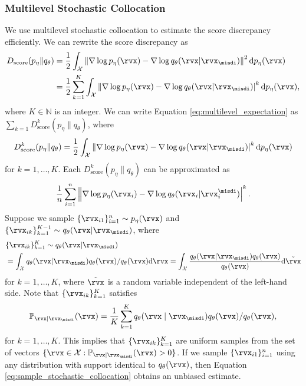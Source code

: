 \subsubsection{Multilevel Stochastic Collocation}
We use multilevel stochastic collocation \citep{Giles2008} to estimate the score discrepancy efficiently. We can rewrite the score discrepancy as
\begin{align}
	D_{\text{score}}(p_{\eta} \| q_{\theta}) &= \frac{1}{2} \int_{\mathcal{X}} \left\| \nabla \log p_{\eta}(\rvx) - \nabla \log q_{\theta}(\rvx | \rvx_{\misdi}) \right\|^{2} \mathrm{d} p_{\eta}(\rvx) \notag \\
	&= \frac{1}{2} \sum_{k=1}^{K} \int_{\mathcal{X}} \left\| \nabla \log p_{\eta}(\rvx) - \nabla \log q_{\theta}(\rvx | \rvx_{\misdi}) \right|^{k} \mathrm{d} p_{\eta}(\rvx), \label{eq:multilevel_expectation}
\end{align}
where $K \in \mathbb{N}$ is an integer.
We can write Equation \eqref{eq:multilevel_expectation} as $\sum_{k=1} D_{\text{score}}^{k}(p_{\eta} \| q_{\theta})$, where
\begin{align}
    D_{\text{score}}^{k}(p_{\eta} \| q_{\theta}) = \frac{1}{2} \int_{\mathcal{X}}  \left\| \nabla \log p_{\eta}(\rvx) - \nabla \log q_{\theta}(\rvx | \rvx_{\misdi}) \right|^{k} \mathrm{d} p_{\eta}(\rvx) \label{eq:multilevel_expectation_k}
\end{align}
for $k=1,\ldots,K$. Each $D_{\text{score}}^{k}(p_{\eta} \| q_{\theta})$ can be approximated as
\begin{align}
	\frac{1}{n} \sum_{i=1}^{n} \left\| \nabla \log p_{\eta}(\rvx_{i}) - \nabla \log q_{\theta}(\rvx_{i} | \rvx_{i}^{\misdi}) \right|^{k}. \label{eq:multilevel_expectation_k_2}
\end{align}
Suppose we sample $\{\rvx_{i1}\}_{i=1}^{n} \sim p_{\eta}(\rvx)$ and $\{\rvx_{ik}\}_{k=1}^{K-1} \sim q_{\theta}(\rvx | \rvx_{\misdi})$, where
\begin{align}
	&\{\rvx_{ik}\}_{k=1}^{K} \sim q_{\theta}(\rvx | \rvx_{\misdi}) \nonumber \\ 
	&= \int_{\mathcal{X}} q_{\theta}(\rvx | \rvx_{\misdi}) q_{\theta}(\rvx) / q_{\theta}(\rvx) \mathrm{d} \rvx = \int_{\mathcal{X}} \frac{q_{\theta}(\rvx | \rvx_{\misdi}) q_{\theta}(\rvx)}{q_{\theta}(\rvx)} \mathrm{d} \tilde{\rvx}  \label{eq:sample_stochastic_collocation} 
\end{align}
for $k=1,\ldots,K$, where $\tilde{\rvx}$ is a random variable independent of the left-hand side. Note that $\{\rvx_{ik}\}_{k=1}^{K}$ satisfies
\begin{align}
	\mathbb{P}_{\rvx \mid \rvx_{\misdi}} (\rvx) = \frac{1}{K} \sum_{k=1}^{K} q_{\theta}(\rvx \mid \rvx_{\misdi}) q_{\theta}(\rvx)/q_{\theta}(\rvx), \label{eq:stochastic_collocation}
\end{align}
for $k=1,\ldots,K$. This implies that $\{\rvx_{ik}\}_{k=1}^{K}$ are uniform samples from the set of vectors $\{\rvx \in \mathcal{X} : \mathbb{P}_{\rvx \mid \rvx_{\misdi}}(\rvx) > 0 \}$. If we sample $\{\rvx_{i1}\}_{i=1}^{n}$ using any distribution with support identical to $q_{\theta}(\rvx)$, then Equation \eqref{eq:sample_stochastic_collocation} obtains an unbiased estimate.

